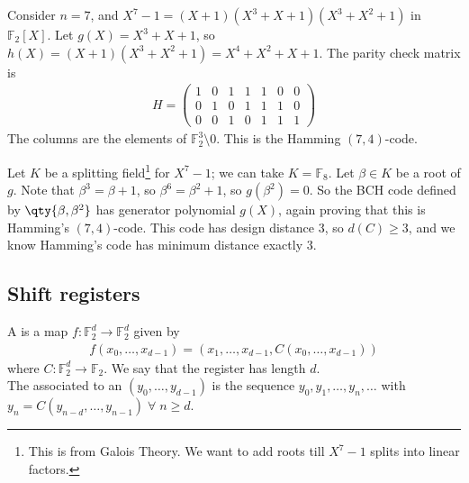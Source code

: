 \begin{example}

    Consider $n = 7$, and $X^7 - 1 = (X + 1)(X^3 + X + 1)(X^3 + X^2 + 1)$ in $\mathbb F_2[X]$.
    Let $g(X) = X^3 + X + 1$, so $h(X) = (X + 1)(X^3 + X^2 + 1) = X^4 + X^2 + X + 1$.
    The parity check matrix is
    \begin{align*}
        H = \begin{pmatrix}
            1 & 0 & 1 & 1 & 1 & 0 & 0 \\
            0 & 1 & 0 & 1 & 1 & 1 & 0 \\
            0 & 0 & 1 & 0 & 1 & 1 & 1
        \end{pmatrix}
    \end{align*}
    The columns are the elements of $\mathbb F_2^3 \setminus \qty{0}$.
    This is the Hamming $(7,4)$-code.

    Let $K$ be a splitting field\footnote{This is from Galois Theory. We want to add roots till $X^7 - 1$ splits into linear factors.} for $X^7 - 1$; we can take $K = \mathbb F_8$.
    Let $\beta \in K$ be a root of $g$.
    Note that $\beta^3 = \beta + 1$, so $\beta^6 = \beta^2 + 1$, so $g(\beta^2) = 0$. %
    So the BCH code defined by $\qty{\beta, \beta^2}$ has generator polynomial $g(X)$, again proving that this is Hamming's $(7,4)$-code.
    This code has design distance $3$, so $d(C) \geq 3$, and we know Hamming's code has minimum distance exactly 3.
\end{example}

\subsection{Shift registers}

\begin{definition}
    A  is a map $f \colon \mathbb F_2^d \to \mathbb F_2^d$ given by
    \begin{align*}
        f(x_0, \dots, x_{d-1}) = (x_1, \dots, x_{d-1}, C(x_0, \dots, x_{d-1}))
    \end{align*}
    where $C \colon \mathbb F_2^d \to \mathbb F_2$.
    We say that the register has length $d$. \\
    The  associated to an  $(y_0, \dots, y_{d-1})$ is the sequence $y_0, y_1, \dots, y_n, \dots$ with $y_n = C(y_{n-d}, \dots, y_{n-1}) \; \forall \; n \geq d$.
\end{definition}

